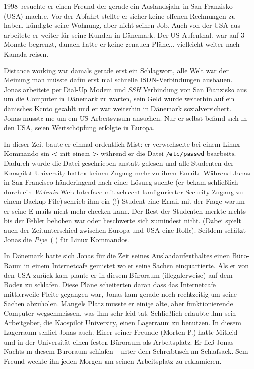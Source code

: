 1998 besuchte er einen Freund der gerade ein Auslandsjahr in San Franzisko (USA) machte. Vor der Abfahrt stellte er sicher keine offenen Rechnungen zu haben, kündigte seine Wohnung, aber nicht seinen Job. Auch von der USA aus arbeitete er weiter für seine Kunden in Dänemark. Der US-Aufenthalt war auf 3 Monate begrenzt, danach hatte er keine genauen Pläne... vielleicht weiter nach Kanada reisen. 

Distance working war damals gerade erst ein Schlagwort, alle Welt war der Meinung man müsste dafür erst mal schnelle ISDN-Verbindungen ausbauen. Jonas arbeitete per Dial-Up Modem und \href{http://de.wikipedia.org/wiki/Secure_Shell}{\textit{SSH}} Verbindung von San Franzisko aus um die Computer in Dänemark zu warten, sein Geld wurde weiterhin auf ein dänisches Konto gezahlt und er war weiterhin in Dänemark sozialversichert. Jonas musste nie um ein US-Arbeitsvisum ansuchen. Nur er selbst befand sich in den USA, seien Wertschöpfung erfolgte in Europa.

In dieser Zeit baute er einmal ordentlich Mist: er verwechselte bei einem Linux-Kommando ein \textbf{\textless} mit einem \textbf{\textgreater} während er die Datei \texttt{/etc/passwd} bearbeite. Dadurch wurde die Datei geschrieben anstatt gelesen und alle Studenten der Kaospilot University hatten keinen Zugang mehr zu ihren Emails. Während Jonas in San Francisco händeringend nach einer Lösung suchte (er bekam schließlich durch ein \href{https://en.wikipedia.org/wiki/Webmin}{\textit{Webmin}}-Web-Interface mit schlecht konfigurierter Security Zugang zu einem Backup-File) schrieb ihm ein (!) Student eine Email mit der Frage warum er seine E-mails nicht mehr checken kann. Der Rest der Studenten merkte nichts bis der Fehler behoben war oder beschwerte sich zumindest nicht. (Dabei spielt auch der Zeitunterschied zwischen Europa und USA eine Rolle). Seitdem schätzt Jonas die \textit{Pipe}\ (\textbf{$|$}) für Linux Kommandos.

In Dänemark hatte sich Jonas für die Zeit seines Auslandaufenthaltes einen Büro-Raum in einem Internetcafe gemietet wo er seine Sachen einquartierte. Als er von den USA zurück kam plante er in diesem Büroraum (illegalerweise) auf dem Boden zu schlafen. Diese Pläne scheiterten daran dass das Internetcafe mittlerweile Pleite gegangen war, Jonas kam gerade noch rechtzeitig um seine Sachen abzuholen. Mangels Platz musste er einige alte, aber funktionierende Computer wegschmeissen, was ihm sehr leid tat. Schließlich erlaubte ihm sein Arbeitgeber, die Kaospilot University, einen Lagerraum zu benutzen. In diesem Lagerraum schlief Jonas auch. Einer seiner Freunde (Morten P.) hatte Mitleid und in der Universität einen festen Büroraum als Arbeitsplatz. Er ließ Jonas Nachts in diesem Büroraum schlafen -  unter dem Schreibtisch im Schlafsack. Sein Freund weckte ihn jeden Morgen um seinen Arbeitsplatz zu reklamieren.

